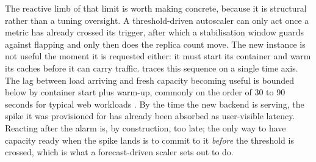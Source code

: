 The reactive limb of that limit is worth making concrete, because it is structural
rather than a tuning oversight. A threshold-driven autoscaler can only act once a
metric has already crossed its trigger, after which a stabilisation window guards
against flapping and only then does the replica count move. The new instance is not
useful the moment it is requested either: it must start its container and warm its
caches before it can carry traffic.  traces this sequence on a
single time axis. The lag between load arriving and fresh capacity becoming useful
is bounded below by container start plus warm-up, commonly on the order of
30 to 90 seconds for typical web workloads \cite{verma2015borg}. By the
time the new backend is serving, the spike it was provisioned for has already been
absorbed as user-visible latency. Reacting after the alarm is, by construction, too
late; the only way to have capacity ready when the spike lands is to commit to it
\emph{before} the threshold is crossed, which is what a forecast-driven scaler sets
out to do.

